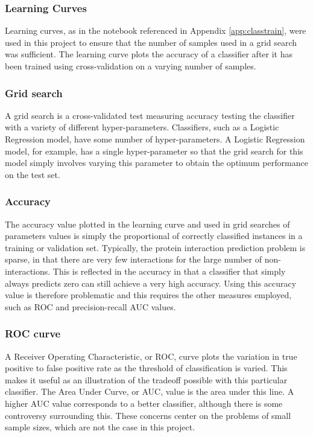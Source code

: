 \subsubsection*{Learning Curves}
Learning curves, as in the notebook referenced in Appendix \ref{app:classtrain}, were used in this project to ensure that the number of samples used in a grid search was sufficient.
The learning curve plots the accuracy of a classifier after it has been trained using cross-validation on a varying number of samples.


\subsubsection*{Grid search}
A grid search is a cross-validated test measuring accuracy testing the classifier with a variety of different hyper-parameters.
Classifiers, such as a Logistic Regression model, have some number of hyper-parameters.
A Logistic Regression model, for example, has a single hyper-parameter so that the grid search for this model simply involves varying this parameter to obtain the optimum performance on the test set.

\subsubsection*{Accuracy}
The accuracy value plotted in the learning curve and used in grid searches of parameters values is simply the proportional of correctly classified instances in a training or validation set.
Typically, the protein interaction prediction problem is sparse, in that there are very few interactions for the large number of non-interactions.
This is reflected in the accuracy in that a classifier that simply always predicts zero can still achieve a very high accuracy.
Using this accuracy value is therefore problematic and this requires the other measures employed, such as ROC and precision-recall AUC values.

\subsubsection*{ROC curve}
A Receiver Operating Characteristic, or ROC, curve plots the variation in true positive to false positive rate as the threshold of classification is varied.
This makes it useful as an illustration of the tradeoff possible with this particular classifier.
The Area Under Curve, or AUC, value is the area under this line.
A higher AUC value corresponds to a better classifier, although there is some controversy surrounding this\autocite{hanczar_small-sample_2010}.
These concerns center on the problems of small sample sizes, which are not the case in this project.


